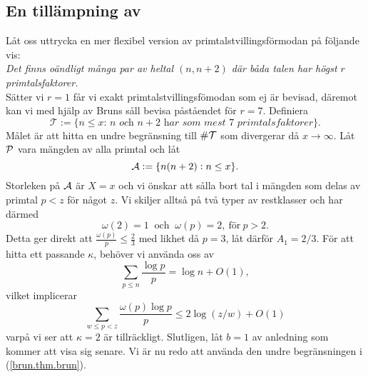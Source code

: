 



\subsection{En tillämpning av}
Låt oss uttrycka en mer flexibel version av primtalstvillingsförmodan på följande vis:\\
\textit{Det finns oändligt många par av heltal $(n, n+2)$ där båda talen har högst $r$ primtalsfaktorer.}\\
Sätter vi $r=1$ får vi exakt primtalstvillingsfömodan som ej är bevisad, däremot kan vi med hjälp av Bruns såll bevisa påståendet för $r=7$.
Definiera
\begin{equation*}
    \mathcal{T} := \{\textit{$n\leq x$: $n$ och $n+2$ har som mest $7$ primtalsfaktorer}\}.
\end{equation*}
Målet är att hitta en undre begränsning till $\card{\mathcal{T}}$ som divergerar då $x\to\infty$. Låt $\P$ vara mängden av alla primtal och låt
\begin{equation*}
    \A := \{n(n+2): n\leq x\}.
\end{equation*}
Storleken på $\A$ är $X=x$ och vi önskar att sålla bort tal i mängden som delas av primtal $p<z$ för något $z$.
Vi skiljer alltså på två typer av restklasser och har därmed
\begin{equation*}
    \omega(2)=1\ \text{ och }\ \omega(p)=2,\ \text{för}\ p>2.
\end{equation*}
Detta ger direkt att $\frac{\omega(p)}{p}\leq\frac{2}{3}$ med likhet då $p=3$, låt därför $A_1=2/3$. För att hitta ett passande $\kappa$, behöver vi använda oss av
\begin{equation}\label{brun.eq.sum_logp_over_p}
    \sum_{p\leq n}\frac{\log p}{p} = \log n + O(1),
\end{equation}
vilket implicerar
\begin{equation*}
    \sum_{w\leq p<z} \frac{\omega(p)\log p}{p} \leq 2\log\left(z/w\right) + O(1)
\end{equation*}
varpå vi ser att $\kappa=2$ är tillräckligt. Slutligen, låt $b=1$ av anledning som kommer att visa sig senare. Vi är nu redo att använda den undre begränsningen i (\ref{brun.thm.brun}). 



